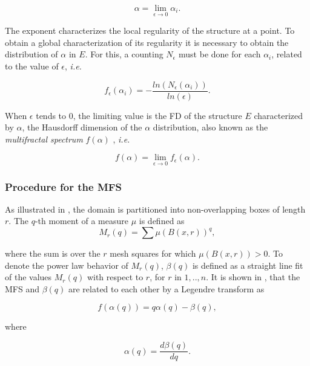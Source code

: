 \begin{equation}
\alpha = \lim_{\epsilon\to0}{\alpha_{i}}.
\label{eqn:eqn5}
\end{equation}

The exponent characterizes the local regularity of the structure at a point. To obtain a global characterization of its regularity it is necessary to obtain the distribution of $\alpha$ in $E$. For this, a counting $N_{\epsilon}$ must be done for each $\alpha_{i}$, related to the value of $\epsilon$, {\em i.e.}

\begin{equation}
f_{\epsilon}(\alpha_{i}) = - \frac{ln(N_{\epsilon}(\alpha_{i}))}{ln(\epsilon)}.
\label{eqn:eqn6}
\end{equation}

When $\epsilon$ tends to $0$, the limiting value is the FD of the structure $E$ characterized by $\alpha$, the Hausdorff dimension of the $\alpha$ distribution, also known as the {\em multifractal spectrum} $f(\alpha)$ \cite{Silvetti2010}, {\em i.e.}

\begin{equation}
f(\alpha) = \lim_{\epsilon\to0}{f_{\epsilon}(\alpha)}.
\label{eqn:eqn7}
\end{equation}

\subsubsection{Procedure for the MFS}
As illustrated in \cite{Xu2006}, the domain is partitioned into non-overlapping boxes of length $r$. The $q$-th moment of a measure $\mu$ is defined as
\begin{equation}
M_{r}(q) = \sum{\mu(B(x,r))^{q}},
\label{eqn:eqn8}
\end{equation}

where the sum is over the $r$ mesh squares for which $\mu(B(x,r)) > 0$. To denote the power law behavior of $M_{r}(q)$, $\beta(q)$ is defined as a straight line fit of the values $M_{r}(q)$ with respect to $r$, for $r$ in $1,..,n$. It is shown in \cite{Falconer97}, that the MFS and $\beta(q)$ are related to each other by a Legendre transform as

\begin{equation}
f(\alpha(q)) = q \alpha(q) - \beta(q),
\label{eqn:eqn9}
\end{equation}

where

\begin{equation}
\alpha(q) = \frac{d\beta(q)}{dq}.
\label{eqn:eqn10}
\end{equation}

